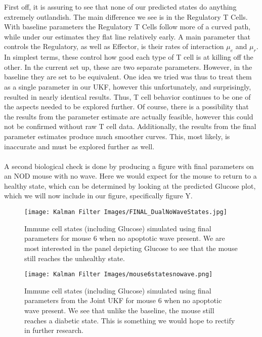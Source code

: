 First off, it is assuring to see that none of our predicted states do anything extremely outlandish. The main difference we see is in the Regulatory T Cells. With baseline parameters the Regulatory T Cells follow more of a curved path, while under our estimates they flat line relatively early. A main parameter that controls the Regulatory, as well as Effector, is their rates of interaction $\mu_e$ and $\mu_r$. In simplest terms, these control how good each type of T cell is at killing off the other. In the current set up, these are two separate parameters. However, in the baseline they are set to be equivalent. One idea we tried was thus to treat them as a single parameter in our UKF, however this unfortunately, and surprisingly, resulted in nearly identical results. Thus, T cell behavior continues to be one of the aspects needed to be explored further. Of course, there is a possibility that the results from the parameter estimate are actually feasible, however this could not be confirmed without raw T cell data. Additionally, the results from the final parameter estimates produce much smoother curves. This, most likely, is inaccurate and must be explored further as well.\\
\\
A second biological check is done by producing a figure with final parameters on an NOD mouse with no wave. Here we would expect for the mouse to return to a healthy state, which can be determined by looking at the predicted Glucose plot, which we will now include in our figure, specifically figure Y.\\

\begin{figure}[H]
    \centering
    \texttt{[image: Kalman Filter Images/FINAL\_DualNoWaveStates.jpg]}
    \caption{Immune cell states (including Glucose) simulated using final parameters for mouse 6 when no apoptotic wave present. We are most interested in the panel depicting Glucose to see that the mouse still reaches the unhealthy state.}

\end{figure}



\begin{figure}[H]
    \centering
    \texttt{[image: Kalman Filter Images/mouse6statesnowave.png]}
    \caption{Immune cell states (including Glucose) simulated using final parameters from the Joint UKF for mouse 6 when no apoptotic wave present. We see that unlike the baseline, the mouse still reaches a diabetic state. This is something we would hope to rectify in further research.}

\end{figure}



